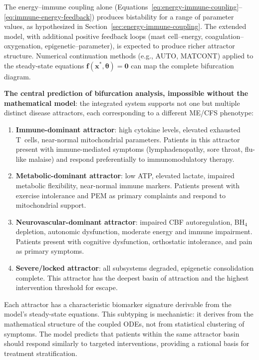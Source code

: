 The energy--immune coupling alone (Equations~\ref{eq:energy-immune-coupling}--\ref{eq:immune-energy-feedback}) produces bistability for a range of parameter values, as hypothesized in Section~\ref{sec:energy-immune-coupling}. The extended model, with additional positive feedback loops (mast cell--energy, coagulation--oxygenation, epigenetic--parameter), is expected to produce richer attractor structure. Numerical continuation methods (e.g., AUTO, MATCONT) applied to the steady-state equations $\mathbf{f}(\mathbf{x}^*, \boldsymbol{\theta}) = \mathbf{0}$ can map the complete bifurcation diagram.

\textbf{The central prediction of bifurcation analysis, impossible without the mathematical model}: the integrated system supports not one but multiple distinct disease attractors, each corresponding to a different ME/CFS phenotype:

\begin{enumerate}
    \item \textbf{Immune-dominant attractor}: high cytokine levels, elevated exhausted T~cells, near-normal mitochondrial parameters. Patients in this attractor present with immune-mediated symptoms (lymphadenopathy, sore throat, flu-like malaise) and respond preferentially to immunomodulatory therapy.
    \item \textbf{Metabolic-dominant attractor}: low ATP, elevated lactate, impaired metabolic flexibility, near-normal immune markers. Patients present with exercise intolerance and PEM as primary complaints and respond to mitochondrial support.
    \item \textbf{Neurovascular-dominant attractor}: impaired CBF autoregulation, BH$_4$ depletion, autonomic dysfunction, moderate energy and immune impairment. Patients present with cognitive dysfunction, orthostatic intolerance, and pain as primary symptoms.
    \item \textbf{Severe/locked attractor}: all subsystems degraded, epigenetic consolidation complete. This attractor has the deepest basin of attraction and the highest intervention threshold for escape.
\end{enumerate}

Each attractor has a characteristic biomarker signature derivable from the model's steady-state equations. This subtyping is mechanistic: it derives from the mathematical structure of the coupled ODEs, not from statistical clustering of symptoms. The model predicts that patients within the same attractor basin should respond similarly to targeted interventions, providing a rational basis for treatment stratification.

